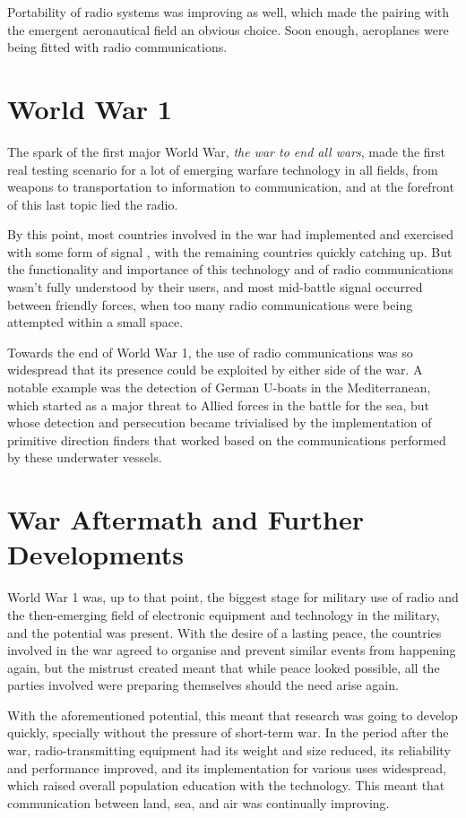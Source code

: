 \documentclass[english,purist]{ist-report}
\begin{document}
Portability of radio systems was improving as well, which made the pairing with the emergent aeronautical field an obvious choice. Soon enough, aeroplanes were being fitted with radio communications.

\section{World War 1}

The spark of the first major World War, \textit{the war to end all wars}, made the first real testing scenario for a lot of emerging warfare technology in all fields, from weapons to transportation to information to communication, and at the forefront of this last topic lied the radio.

By this point, most countries involved in the war had implemented and exercised with some form of signal \jamming{}, with the remaining countries quickly catching up. But the functionality and importance of this technology and of radio communications wasn't fully understood by their users, and most mid-battle signal \jamming{} occurred between friendly forces, when too many radio communications were being attempted within a small space.

Towards the end of World War 1, the use of radio communications was so widespread that its presence could be exploited by either side of the war. A notable example was the detection of German U-boats in the Mediterranean, which started as a major threat to Allied forces in the battle for the sea, but whose detection and persecution became trivialised by the implementation of primitive direction finders that worked based on the communications performed by these underwater vessels.

\section{War Aftermath and Further Developments}\label{sec:betweenwars}

World War 1 was, up to that point, the biggest stage for military use of radio and the then-emerging field of electronic equipment and technology in the military, and the potential was present. With the desire of a lasting peace, the countries involved in the war agreed to organise and prevent similar events from happening again, but the mistrust created meant that while peace looked possible, all the parties involved were preparing themselves should the need arise again.

With the aforementioned potential, this meant that research was going to develop quickly, specially without the pressure of short-term war. In the period after the war, radio-transmitting equipment had its weight and size reduced, its reliability and performance improved, and its implementation for various uses widespread, which raised overall population education with the technology. This meant that communication between land, sea, and air was continually improving.
\end{document}
